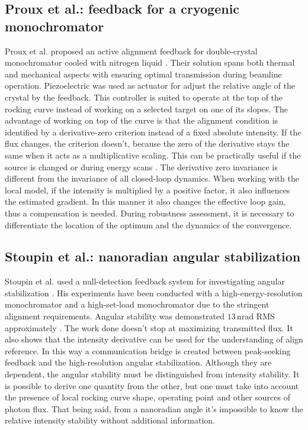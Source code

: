 \subsection{Proux et al.: feedback for a cryogenic monochromator}

Proux et al. proposed an active alignment feedback for double-crystal monochromator cooled with nitrogen liquid \cite{Proux2006}. 
Their solution spans both thermal and mechanical aspects with ensuring optimal transmission during beamline operation.
Piezoelectric was used as actuator for adjust the relative angle of the crystal by the feedback.
This controller is suited to operate at the top of the rocking curve instead of working on a selected target on one of its slopes.
The advantage of working on top of the curve is that the alignment condition is identified by a derivative-zero criterion instead of a fixed absolute intensity. 
If the flux changes, the criterion doesn't, because the zero of the derivative stays the same when it acts as a multiplicative scaling.
This can be practically useful if the source is changed or during energy scans
\cite{Proux2006}.
The derivative zero invariance is different from the invariance of all closed-loop dynamics.
When working with the local model, if the intensity is multiplied by a positive factor, it also influences the estimated gradient.
In this manner it also changes the effective loop gain, thus a compensation is needed.
During robustness assessment, it is necessary to differentiate the location of the optimum and the dynamics of the convergence.

\subsection{Stoupin et al.: nanoradian angular stabilization}

Stoupin et al. used a null-detection feedback system for investigating angular stabilization \cite{Stoupin2010}. 
His experiments have been conducted with a high-energy-resolution monochromator and a high-set-load monochromator due to the stringent alignment requirements.
Angular stability was demonstrated $13\,\mathrm{nrad}$ RMS approximately \cite{Stoupin2010}.
The work done doesn't stop at maximizing transmitted flux.
It also shows that the intensity derivative can be used for the understanding of align reference.
In this way a communication bridge is created between peak-seeking feedback and the high-resolution angular stabilization.
Although they are dependent, the angular stability must be distinguished from intensity stability.
It is possible to derive one quantity from the other, but one must take into account the presence of local rocking curve shape, operating point and other sources of photon flux. 
That being said, from a nanoradian angle it's impossible to know the relative intensity stability without additional information.

